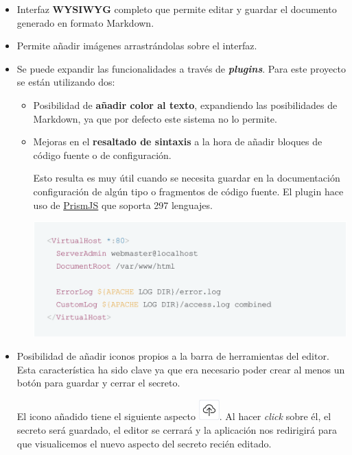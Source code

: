 \documentclass{\ClassPath/viu-tfm-template}
\begin{document}
\begin{itemize}
    \item Interfaz \textbf{WYSIWYG} completo que permite editar y guardar el documento generado en formato Markdown.
    \item Permite añadir imágenes arrastrándolas sobre el interfaz.
    \item Se puede expandir las funcionalidades a través de \textit{\textbf{plugins}}. Para este proyecto se están utilizando dos:
    \begin{itemize}
        \item Posibilidad de \textbf{añadir color al texto}, expandiendo las posibilidades de Markdown, ya que por defecto este sistema no lo permite.
        \item Mejoras en el \textbf{resaltado de sintaxis} a la hora de añadir bloques de código fuente o de configuración.

        Esto resulta es muy útil cuando se necesita guardar en la documentación configuración de algún tipo o fragmentos de código fuente. El plugin hace uso de \href{https://prismjs.com/}{PrismJS} que soporta 297 lenguajes.
        \begin{center}
            \includegraphics[frame,width=0.7\linewidth]{img/editor_example.png}
        \end{center}
    \end{itemize}

    \item Posibilidad de añadir iconos propios a la barra de herramientas del editor. Esta característica ha sido clave ya que era necesario poder crear al menos un botón para guardar y cerrar el secreto.

    El icono añadido tiene el siguiente aspecto \includegraphics[width=0.8cm]{img/save_exit.png}. Al hacer \textit{click} sobre él, el secreto será guardado, el editor se cerrará y la aplicación nos redirigirá para que visualicemos el nuevo aspecto del secreto recién editado.
\end{itemize}
\end{document}
